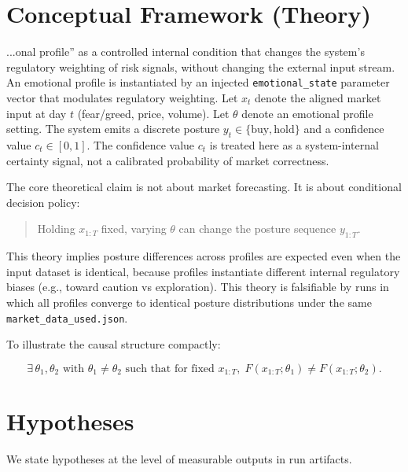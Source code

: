 \documentclass[12pt,a4paper]{article}
\begin{document}
\section{Conceptual Framework (Theory)}

...onal profile'' as a controlled internal condition that changes the system's regulatory weighting of risk signals, without changing the external input stream. An emotional profile is instantiated by an injected \texttt{emotional\_state} parameter vector that modulates regulatory weighting. Let $x_t$ denote the aligned market input at day $t$ (fear/greed, price, volume). Let $\theta$ denote an emotional profile setting. The system emits a discrete posture $y_t \in \{\text{buy}, \text{hold}\}$ and a confidence value $c_t \in [0,1]$. The confidence value $c_t$ is treated here as a system-internal certainty signal, not a calibrated probability of market correctness.

The core theoretical claim is not about market forecasting. It is about conditional decision policy:

\begin{quote}
Holding $x_{1:T}$ fixed, varying $\theta$ can change the posture sequence $y_{1:T}$.
\end{quote}

This theory implies posture differences across profiles are expected even when the input dataset is identical, because profiles instantiate different internal regulatory biases (e.g., toward caution vs exploration). This theory is falsifiable by runs in which all profiles converge to identical posture distributions under the same \texttt{market\_data\_used.json}.

To illustrate the causal structure compactly:

\[
\exists\, \theta_1, \theta_2 \text{ with } \theta_1 \neq \theta_2
\text{ such that for fixed } x_{1:T},\;
F(x_{1:T}; \theta_1) \neq F(x_{1:T}; \theta_2).
\]

\section{Hypotheses}

We state hypotheses at the level of measurable outputs in run artifacts.
\end{document}
